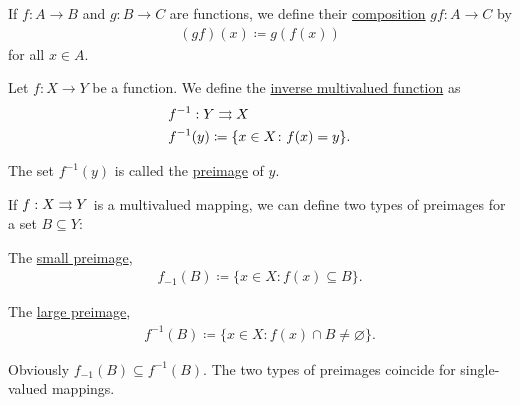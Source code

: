 \begin{definition}\label{def:function_composition}
  If $f: A \to B$ and $g: B \to C$ are functions, we define their \ul{composition} $gf: A \to C$ by
  \begin{align*}
    (gf)(x) \coloneqq g(f(x))
  \end{align*}
  for all $x \in A$.
\end{definition}

\begin{definition}\label{def:function_preimage}
  Let $f: X \to Y$ be a function. We define the \ul{inverse multivalued function} as
  \begin{align*}
    &f^{-1} : Y \rightrightarrows X \\
    &f^{-1}(y) \coloneqq \{ x \in X \colon f(x) = y \}.
  \end{align*}

  The set $f^{-1}(y)$ is called the \ul{preimage} of $y$.

  If $f : X \rightrightarrows Y$ is a multivalued mapping, we can define two types of preimages for a set $B \subseteq Y$:
  \begin{defenum}
    \item The \ul{small preimage},
    \begin{align*}
      f_{-1}(B) \coloneqq \{ x \in X \colon f(x) \subseteq B \}.
    \end{align*}

    \item The \ul{large preimage},
    \begin{align*}
      f^{-1}(B) \coloneqq \{ x \in X \colon f(x) \cap B \neq \varnothing \}.
    \end{align*}
  \end{defenum}

  Obviously $f_{-1}(B) \subseteq f^{-1}(B)$. The two types of preimages coincide for single-valued mappings.
\end{definition}

